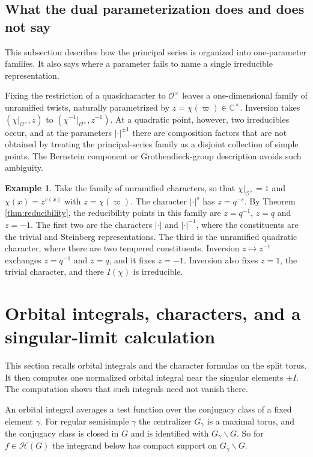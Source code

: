 \documentclass[12pt,letterpaper]{amsart}
\numberwithin{equation}{section}
\theoremstyle{definition}
\newtheorem*{example*}{Example}
\theoremstyle{remark}
\newcommand{\calH}{\mathcal H}
\begin{document}
\subsection{What the dual parameterization does and does not say}
This subsection describes how the principal series is organized into one-parameter families. It also says where a parameter fails to name a single irreducible representation.

Fixing the restriction of a quasicharacter to $\mathcal O^\times$ leaves a one-dimensional family of unramified twists, naturally parametrized by $z=\chi(\varpi)\in\mathbb C^\times$.  Inversion takes $(\chi|_{\mathcal O^\times},z)$ to $(\chi^{-1}|_{\mathcal O^\times},z^{-1})$. At a quadratic point, however, two irreducibles occur, and at the parameters $|\cdot|^{\pm1}$ there are composition factors that are not obtained by treating the principal-series family as a disjoint collection of simple points. The Bernstein component or Grothendieck-group description avoids such ambiguity.
\begin{example*}
Take the family of unramified characters, so that $\chi|_{\mathcal O^\times}=1$ and $\chi(x)=z^{v(x)}$ with $z=\chi(\varpi)$. The character $|\cdot|^s$ has $z=q^{-s}$. By Theorem \ref{thm:reducibility}, the reducibility points in this family are $z=q^{-1}$, $z=q$ and $z=-1$. The first two are the characters $|\cdot|$ and $|\cdot|^{-1}$, where the constituents are the trivial and Steinberg representations. The third is the unramified quadratic character, where there are two tempered constituents. Inversion $z\mapsto z^{-1}$ exchanges $z=q^{-1}$ and $z=q$, and it fixes $z=-1$. Inversion also fixes $z=1$, the trivial character, and there $I(\chi)$ is irreducible.
\end{example*}



\section{Orbital integrals, characters, and a singular-limit calculation}\label{sec:orbital}
This section recalls orbital integrals and the character formulas on the split torus. It then computes one normalized orbital integral near the singular elements $\pm I$. The computation shows that such integrals need not vanish there.

An orbital integral averages a test function over the conjugacy class of a fixed element $\gamma$. For regular semisimple $\gamma$ the centralizer $G_\gamma$ is a maximal torus, and the conjugacy class is closed in $G$ and is identified with $G_\gamma\backslash G$. So for $f\in\calH(G)$ the integrand below has compact support on $G_\gamma\backslash G$.
\end{document}
